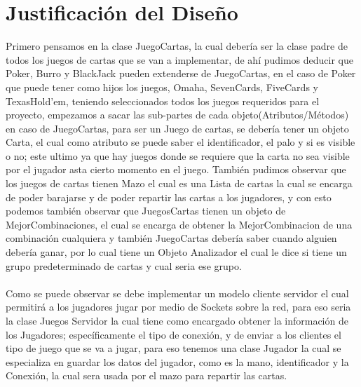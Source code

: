 \documentclass{article}
\begin{document}
\section{Justificación del Diseño}
Primero pensamos en la clase JuegoCartas, la cual debería ser la clase padre de todos los juegos de cartas que se van a implementar, de ahí pudimos deducir que Poker, Burro y BlackJack pueden extenderse de JuegoCartas, en el caso de Poker que puede tener como hijos los juegos, Omaha, SevenCards, FiveCards y TexasHold'em, teniendo seleccionados todos los juegos requeridos para el proyecto, empezamos a sacar las sub-partes de cada objeto(Atributos/Métodos) en caso de JuegoCartas, para ser un Juego de cartas, se debería tener un objeto Carta, el cual como atributo se puede saber el identificador, el palo y si es visible o no; este ultimo ya que hay juegos donde se requiere que la carta no sea visible por el jugador asta cierto momento en el juego. También pudimos observar que los juegos de cartas tienen Mazo el cual es una Lista de cartas la cual se encarga de poder barajarse y de poder repartir las cartas a los jugadores, y con esto podemos también observar que JuegosCartas tienen un objeto de MejorCombinaciones, el cual se encarga de obtener la MejorCombinacion de una combinación cualquiera y también JuegoCartas debería saber cuando alguien debería ganar, por lo cual tiene un Objeto Analizador el cual le dice si tiene un grupo predeterminado de cartas y cual seria ese grupo.
\\\\
Como se puede observar se debe implementar un modelo cliente servidor el cual permitirá a los jugadores jugar por medio de Sockets sobre la red, para eso seria la clase Juegos Servidor la cual tiene como encargado obtener la información de los Jugadores; específicamente el tipo de conexión, y de enviar a los clientes el tipo de juego que se va a jugar, para eso tenemos una clase Jugador la cual se especializa en guardar los datos del jugador, como es la mano, identificador y la Conexión, la cual sera usada por el mazo para repartir las cartas.
\newpage
\end{document}
